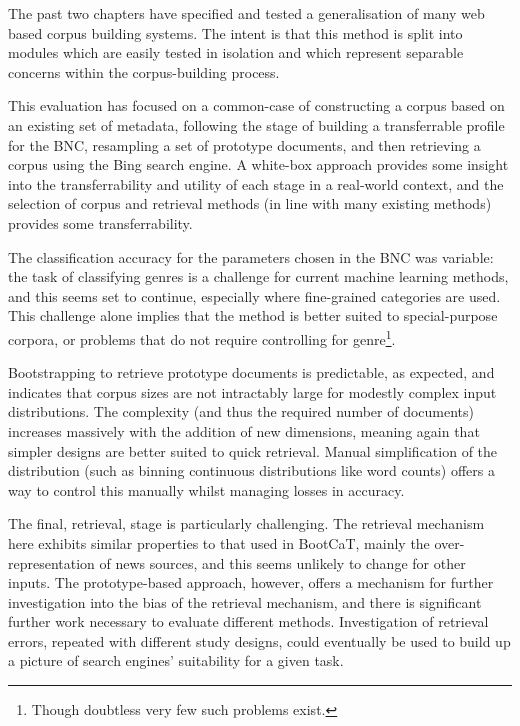 
The past two chapters have specified and tested a generalisation of many web based corpus building systems.  The intent is that this method is split into modules which are easily tested in isolation and which represent separable concerns within the corpus-building process.

This evaluation has focused on a common-case of constructing a corpus based on an existing set of metadata, following the stage of building a transferrable profile for the BNC, resampling a set of prototype documents, and then retrieving a corpus using the Bing search engine.  A white-box approach provides some insight into the transferrability and utility of each stage in a real-world context, and the selection of corpus and retrieval methods (in line with many existing methods) provides some transferrability.



The classification accuracy for the parameters chosen in the BNC was variable: the task of classifying genres is a challenge for current machine learning methods, and this seems set to continue, especially where fine-grained categories are used.  This challenge alone implies that the method is better suited to special-purpose corpora, or problems that do not require controlling for genre\footnote{Though doubtless very few such problems exist.}.

Bootstrapping to retrieve prototype documents is predictable, as expected, and indicates that corpus sizes are not intractably large for modestly complex input distributions.  The complexity (and thus the required number of documents) increases massively with the addition of new dimensions, meaning again that simpler designs are better suited to quick retrieval.  Manual simplification of the distribution (such as binning continuous distributions like word counts) offers a way to control this manually whilst managing losses in accuracy.

The final, retrieval, stage is particularly challenging.  The retrieval mechanism here exhibits similar properties to that used in BootCaT, mainly the over-representation of news sources, and this seems unlikely to change for other inputs.  The prototype-based approach, however, offers a mechanism for further investigation into the bias of the retrieval mechanism, and there is significant further work necessary to evaluate different methods.  Investigation of retrieval errors, repeated with different study designs, could eventually be used to build up a picture of search engines' suitability for a given task.

